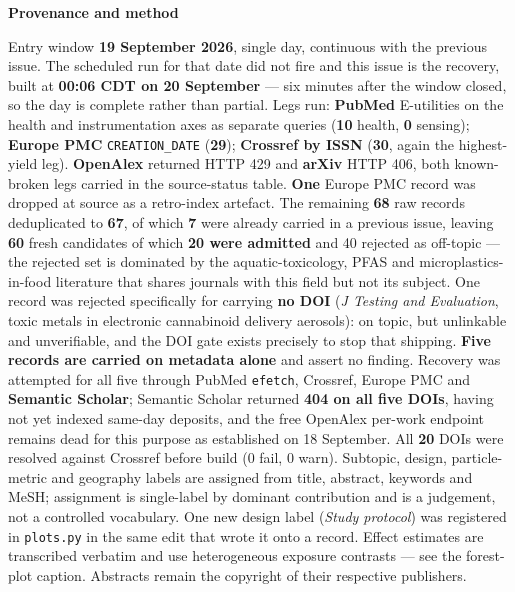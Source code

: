 \documentclass[10pt]{article}
\begin{document}
\vspace{4mm}
\begin{keybox}
{\sffamily\bfseries\footnotesize\color{Deep}Provenance and method}\\[1.2mm]
{\fontsize{7.2}{8.8}\selectfont
Entry window \textbf{19 September 2026}, single day, continuous with the previous issue.
The scheduled run for that date did not fire and this issue is the recovery, built at
\textbf{00:06 CDT on 20 September} --- six minutes after the window closed, so the day is
complete rather than partial. Legs run: \textbf{PubMed} E-utilities on the health and
instrumentation axes as separate queries (\textbf{10} health, \textbf{0} sensing);
\textbf{Europe PMC} \texttt{CREATION\_DATE} (\textbf{29}); \textbf{Crossref by ISSN}
(\textbf{30}, again the highest-yield leg). \textbf{OpenAlex} returned HTTP 429 and
\textbf{arXiv} HTTP 406, both known-broken legs carried in the source-status table.
\textbf{One} Europe PMC record was dropped at source as a retro-index artefact.
The remaining \textbf{68} raw records deduplicated to \textbf{67}, of which \textbf{7} were
already carried in a previous issue, leaving \textbf{60} fresh candidates of which
\textbf{20 were admitted} and 40 rejected as off-topic --- the rejected set is dominated by
the aquatic-toxicology, PFAS and microplastics-in-food literature that shares journals with
this field but not its subject. One record was rejected specifically for carrying
\textbf{no DOI} (\textit{J Testing and Evaluation}, toxic metals in electronic cannabinoid
delivery aerosols): on topic, but unlinkable and unverifiable, and the DOI gate exists
precisely to stop that shipping.
\textbf{Five records are carried on metadata alone} and assert no finding. Recovery was
attempted for all five through PubMed \texttt{efetch}, Crossref, Europe PMC and
\textbf{Semantic Scholar}; Semantic Scholar returned \textbf{404 on all five DOIs}, having
not yet indexed same-day deposits, and the free OpenAlex per-work endpoint remains dead for
this purpose as established on 18 September. All \textbf{20} DOIs were resolved against
Crossref before build (0 fail, 0 warn).
Subtopic, design, particle-metric and geography labels are assigned from title, abstract,
keywords and MeSH; assignment is single-label by dominant contribution and is a judgement,
not a controlled vocabulary. One new design label (\textit{Study protocol}) was registered
in \texttt{plots.py} in the same edit that wrote it onto a record. Effect estimates are
transcribed verbatim and use heterogeneous exposure contrasts --- see the forest-plot
caption. Abstracts remain the copyright of their respective publishers.\par}
\end{keybox}
\end{document}
